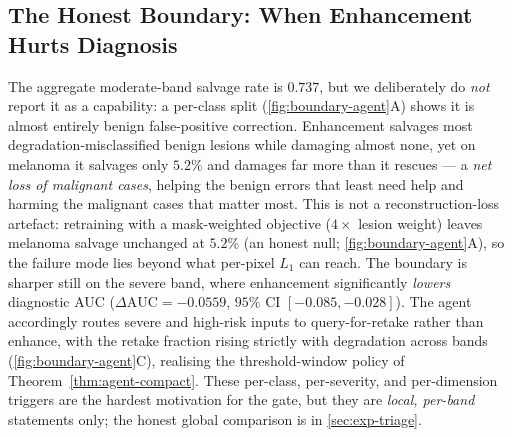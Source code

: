 \subsection{The Honest Boundary: When Enhancement Hurts Diagnosis}
\label{sec:exp-boundary}
The aggregate moderate-band salvage rate is $0.737$, but we deliberately do \emph{not}
report it as a capability: a per-class split (\cref{fig:boundary-agent}A) shows it is
almost entirely benign false-positive correction. Enhancement salvages most
degradation-misclassified benign lesions while damaging almost none, yet on melanoma it
salvages only $5.2\%$ and damages far more than it rescues --- a \emph{net loss of
malignant cases}, helping the benign errors that least need help and harming the
malignant cases that matter most. This is not a reconstruction-loss artefact: retraining
with a mask-weighted objective ($4\times$ lesion weight) leaves melanoma salvage
unchanged at $5.2\%$ (an honest null; \cref{fig:boundary-agent}A), so the failure mode
lies beyond what per-pixel $L_1$ can reach. The boundary is sharper still on the severe
band, where enhancement significantly \emph{lowers} diagnostic AUC
($\Delta\mathrm{AUC}=-0.0559$, $95\%$ CI $[-0.085,-0.028]$). The agent accordingly routes severe and high-risk inputs to
query-for-retake rather than enhance, with the retake fraction rising strictly with
degradation across bands (\cref{fig:boundary-agent}C), realising the threshold-window
policy of Theorem~\ref{thm:agent-compact}. These per-class, per-severity, and
per-dimension triggers are the hardest motivation for the gate, but they are
\emph{local, per-band} statements only; the honest global comparison is in
\cref{sec:exp-triage}.


